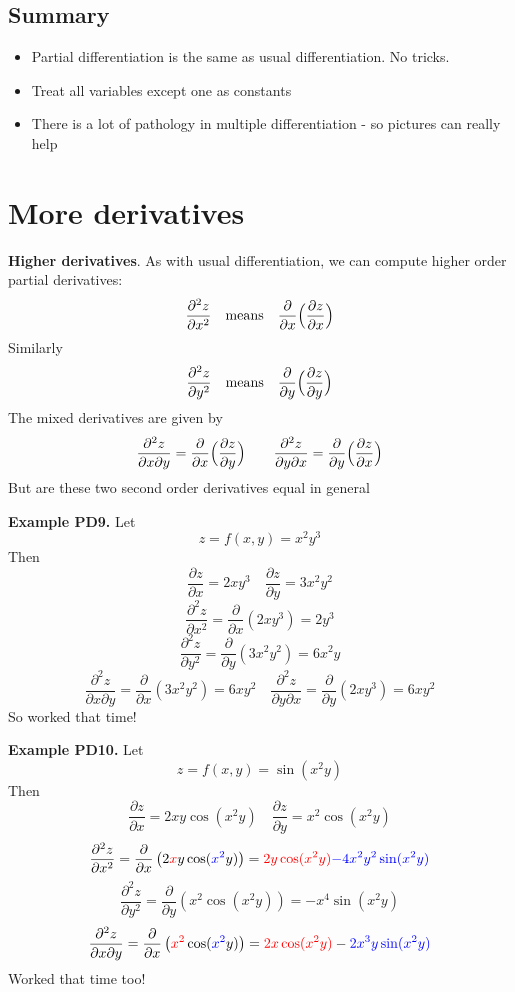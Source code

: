 \documentclass{article}
\begin{document}
\subsection{Summary}

\begin{itemize}
\item
Partial differentiation is the same as usual differentiation. No tricks. 
\item
Treat all variables except one as constants
\item 
There is a lot of pathology in multiple differentiation - so pictures can really help
\end{itemize}


\section{More derivatives}

\textbf{Higher derivatives}. As with usual differentiation, we can compute higher order
partial derivatives:
$$
\frac{\partial^2 z}{\partial x^2}\quad \mbox{means} \quad 
\frac{\partial} {\partial x} \Bigl(\frac{\partial z}{\partial x} \Bigr)
$$
Similarly 
$$
\frac{\partial^2 z}{\partial y^2} \quad \mbox{means} \quad
\frac{\partial}{\partial y} \Bigl( \frac{\partial z}{\partial y}
\Bigr)
$$
The mixed derivatives are given by
$$
\frac{\partial^2 z}{\partial x \partial y} =
 \frac{\partial} {\partial x}
\Bigl( \frac{\partial z}{\partial y} \Bigr) \qquad \frac{\partial^2 z}{\partial y \partial x} =
\frac{\partial}
{\partial y} \Bigl( \frac{\partial z}{\partial x} \Bigr)
$$
But are these two second order derivatives equal in general



\textbf{Example PD9.}
Let
$$
z = f(x,y) = x^2y^3
$$
Then
$$
\frac{\partial z}{\partial x} = 2 x y^3\quad \frac{\partial z}{\partial y} = 3 x^2 y^2
$$
$$
\frac{\partial ^ 2 z}{\partial x^2} = \frac{\partial} {\partial x} \left( 2 x y^3 \right) = 2 y^3
$$
$$
\frac{\partial ^ 2 z}{\partial y^2} =  \frac{\partial} {\partial y} \left( 3 x^2 y^2 \right) = 6 x^2 y
$$
$$
\frac{\partial ^ 2 z}{\partial x \partial y} = \frac{\partial} {\partial x} \left( 3 x^2 y^2 \right) = 6 x y^2 \quad
\frac{\partial ^ 2 z}{\partial y \partial x} = \frac{\partial} {\partial y} \left( 2 x y^3 \right) = 6 x y^2 
$$
So worked that time!


\textbf{Example PD10.}
Let
$$
z = f(x,y) = \sin (x^2 y)
$$
Then
$$
\frac{\partial z}{\partial x} = 2 x y \cos (x^2 y)\quad \frac{\partial z}{\partial y} = x^2 \cos (x^2 y)
$$
$$
\frac{\partial ^ 2 z}{\partial x^2} = \frac{\partial} {\partial x} \left(   2 \textcolor{red}{x} y \cos (\textcolor{blue}{x^2} y) \right) = 
\textcolor{red}{2 y \cos (x^2 y)} \textcolor{blue}{- 4 x^2 y^2 \sin (x^2 y)}
$$
$$
\frac{\partial ^ 2 z}{\partial y^2} = \frac{\partial} {\partial y} \left( x^2 \cos (x^2 y) \right) = - x^4 \sin (x^2 y) 
$$
$$
\frac{\partial ^ 2 z}{\partial x \partial y} = \frac{\partial} {\partial x} \left( \textcolor{red}{x^2} \cos (\textcolor{blue}{x^2} y) \right) = 
\textcolor{red}{2 x \cos (x^2 y)} - \textcolor{blue}{2x^3y \sin (x^2 y)}
$$
Worked that time too!
\end{document}
